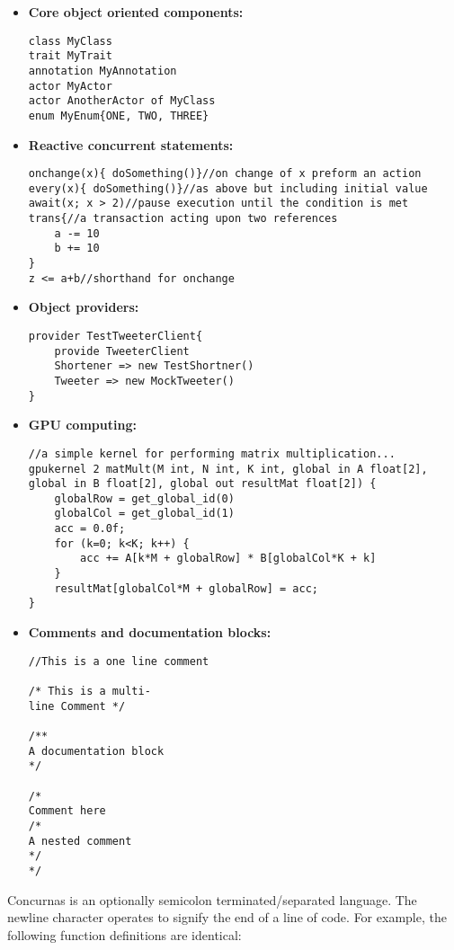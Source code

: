 \documentclass[conc-doc]{subfiles}
\begin{document}
\begin{itemize}
	\item \textbf{Core object oriented components:}
\begin{lstlisting}
class MyClass
trait MyTrait
annotation MyAnnotation
actor MyActor
actor AnotherActor of MyClass
enum MyEnum{ONE, TWO, THREE}
\end{lstlisting}
			
	\item \textbf{Reactive concurrent statements:}
	\begin{lstlisting}
onchange(x){ doSomething()}//on change of x preform an action
every(x){ doSomething()}//as above but including initial value
await(x; x > 2)//pause execution until the condition is met
trans{//a transaction acting upon two references
	a -= 10
	b += 10
}
z <= a+b//shorthand for onchange
	\end{lstlisting}
	
	\item \textbf{Object providers:}
	\begin{lstlisting}
provider TestTweeterClient{
	provide TweeterClient
	Shortener => new TestShortner()
	Tweeter => new MockTweeter()
}
	\end{lstlisting}
	
	\item \textbf{GPU computing:}
	\begin{lstlisting}
//a simple kernel for performing matrix multiplication...
gpukernel 2 matMult(M int, N int, K int, global in A float[2], global in B float[2], global out resultMat float[2]) {
	globalRow = get_global_id(0) 
	globalCol = get_global_id(1) 
	acc = 0.0f;
	for (k=0; k<K; k++) {
		acc += A[k*M + globalRow] * B[globalCol*K + k]
	}
	resultMat[globalCol*M + globalRow] = acc;
} 
\end{lstlisting}

	\item \textbf{Comments and documentation blocks:}
\begin{lstlisting}
//This is a one line comment

/* This is a multi-
line Comment */

/** 
A documentation block 
*/

/*
Comment here
/*
A nested comment
*/
*/	
\end{lstlisting}
	
\end{itemize}


Concurnas is an optionally semicolon terminated/separated language. The newline character operates to signify the end of a line of code. For example, the following function definitions are identical:
\end{document}
